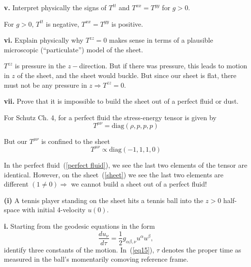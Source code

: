 \documentclass[a4paper]{article} %
\begin{document}
\begin{framed}
\textbf{v.} Interpret physically the signs of $T^{tt}$ and $T^{xx} = T^{yy}$ for $g > 0$.
\end{framed}

For $g>0$, $T^{tt}$ is negative, $T^{xx}=T^{yy}$ is positive.

\begin{framed}
\textbf{vi.}  Explain physically why $T^{zz} = 0$ makes sense in terms of a plausible microscopic
(``particulate'') model of the sheet.
\end{framed}

$T^{zz}$ is pressure in the $z-$direction. But if there was pressure, this leads to motion in $z$ of the sheet, and the sheet would buckle. But since our sheet is flat, there must not be any pressure in $z \Rightarrow T^{zz}=0$.

\begin{framed}
\textbf{vii.} Prove that it is impossible to build the sheet out of a perfect fluid or dust.
\end{framed}

For Schutz Ch. 4, for a perfect fluid the stress-energy tensor is given by
\begin{equation}
T^{\mu\nu}=\text{diag}(\rho,p,p,p)\label{perfect fluid}
\end{equation}

But our $T^{\mu\nu}$ is confined to the sheet
\begin{equation}
T^{\mu\nu}\propto \text{diag}(-1,1,1,0)\label{sheet}
\end{equation}

In the perfect fluid~(\ref{perfect fluid}), we see the last two elements of the tensor are identical. However, on the sheet~(\ref{sheet}) we see the last two elements are different $(1\neq 0) \Rightarrow $ we cannot build a sheet out of a perfect fluid!

\begin{framed}
\textbf{(i)} A tennis player standing on the sheet hits a tennis ball into the $z>0$ half-space with initial 4-velocity $u(0)$.
\end{framed}

\begin{framed}
\textbf{i.} Starting from the geodesic equations in the form
\begin{equation}
\frac{du_{\nu}}{d\tau}=\frac{1}{2}g_{\alpha\beta,\nu}u^{\alpha}u^{\beta},\label{eq15}
\end{equation}
identify three constants of the motion. In~(\ref{eq15}), $\tau$ denotes the proper time as measured in the ball's momentarily comoving reference frame.
\end{framed}
\end{document}
